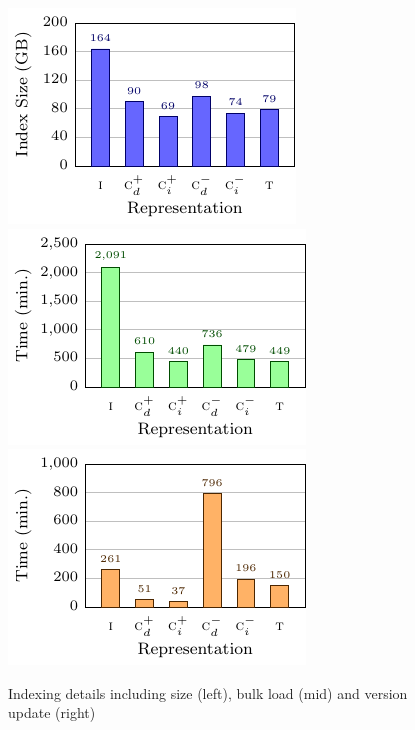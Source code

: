 \documentclass{llncs}
\begin{document}
\begin{figure}[t]
\includegraphics[scale=0.8]{plots/indexsize}
\includegraphics[scale=0.8]{plots/indextime}
\includegraphics[scale=0.8]{plots/updatetime}
\caption{Indexing details including size (left), bulk load (mid) and version update (right) \label{fig:index}}
\end{figure}

%
\end{document}
